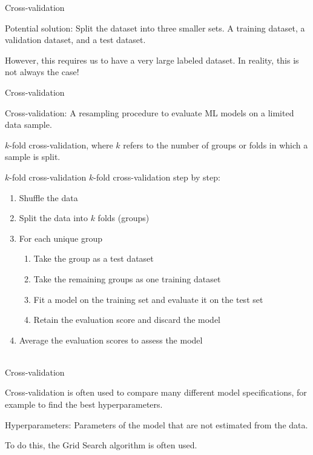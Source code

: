 \documentclass[handout]{beamer}
\begin{document}
\begin{frame}{Cross-validation}
	
	Potential solution: Split the dataset into three smaller sets. A training dataset, a validation dataset, and a test dataset.
	
	However, this requires us to have a very large labeled dataset. In reality, this is not always the case!
	
\end{frame}


\begin{frame}{Cross-validation}
	
	Cross-validation: A resampling procedure to evaluate ML models on a limited data sample.
	
	\(k\)-fold cross-validation, where \(k\) refers to the number of groups or folds in which a sample is split.

\end{frame}


\begin{frame}{\(k\)-fold cross-validation}
	\(k\)-fold cross-validation step by step:
	\begin{enumerate}
		\item Shuffle the data
		\item Split the data into \(k\) folds (groups)
		\item For each unique group
		\begin{enumerate}
			\item Take the group as a test dataset
			\item Take the remaining groups as one training dataset
			\item Fit a model on the training set and evaluate it on the test set
			\item Retain the evaluation score and discard the model
		\end{enumerate}
		\item Average the evaluation scores to assess the model \\\
	\end{enumerate}


\end{frame}
	

\begin{frame}{Cross-validation}
	
	Cross-validation is often used to compare many different model specifications, for example to find the best hyperparameters.
	
	Hyperparameters: Parameters of the model that are not estimated from the data. 
	
	To do this, the Grid Search algorithm is often used.
	
\end{frame}
\end{document}
